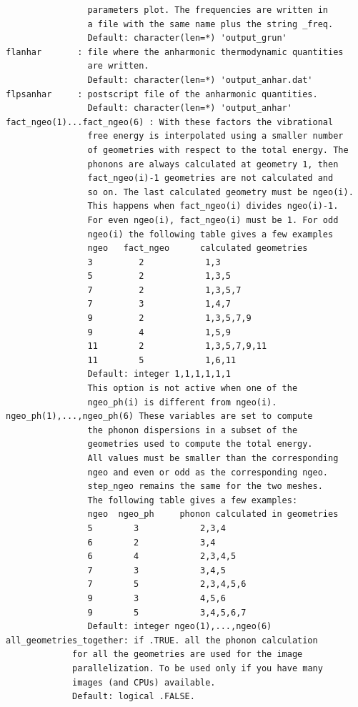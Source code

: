 \documentclass[12pt,a4paper,twoside]{report}
\begin{document}
\begin{verbatim}
                parameters plot. The frequencies are written in 
                a file with the same name plus the string _freq.
                Default: character(len=*) 'output_grun'
flanhar       : file where the anharmonic thermodynamic quantities 
                are written.
                Default: character(len=*) 'output_anhar.dat'
flpsanhar     : postscript file of the anharmonic quantities.
                Default: character(len=*) 'output_anhar'
fact_ngeo(1)...fact_ngeo(6) : With these factors the vibrational 
                free energy is interpolated using a smaller number 
                of geometries with respect to the total energy. The 
                phonons are always calculated at geometry 1, then 
                fact_ngeo(i)-1 geometries are not calculated and 
                so on. The last calculated geometry must be ngeo(i). 
                This happens when fact_ngeo(i) divides ngeo(i)-1. 
                For even ngeo(i), fact_ngeo(i) must be 1. For odd 
                ngeo(i) the following table gives a few examples
                ngeo   fact_ngeo      calculated geometries
                3         2            1,3
                5         2            1,3,5
                7         2            1,3,5,7
                7         3            1,4,7
                9         2            1,3,5,7,9
                9         4            1,5,9
                11        2            1,3,5,7,9,11
                11        5            1,6,11
                Default: integer 1,1,1,1,1,1
                This option is not active when one of the 
                ngeo_ph(i) is different from ngeo(i).
ngeo_ph(1),...,ngeo_ph(6) These variables are set to compute 
                the phonon dispersions in a subset of the 
                geometries used to compute the total energy. 
                All values must be smaller than the corresponding 
                ngeo and even or odd as the corresponding ngeo. 
                step_ngeo remains the same for the two meshes.
                The following table gives a few examples:
                ngeo  ngeo_ph     phonon calculated in geometries
                5        3            2,3,4
                6        2            3,4
                6        4            2,3,4,5
                7        3            3,4,5
                7        5            2,3,4,5,6
                9        3            4,5,6
                9        5            3,4,5,6,7
                Default: integer ngeo(1),...,ngeo(6)
all_geometries_together: if .TRUE. all the phonon calculation 
             for all the geometries are used for the image 
             parallelization. To be used only if you have many 
             images (and CPUs) available.
             Default: logical .FALSE.
\end{verbatim}
\end{document}
